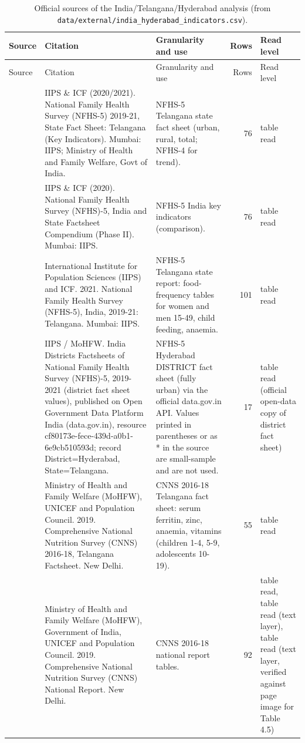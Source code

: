 {\scriptsize\begin{longtable}{L{0.140}L{0.343}L{0.330}rL{0.102}}
\caption[Official sources of the India/Telangana/Hyderabad analysis]{Official sources of the India/Telangana/Hyderabad analysis (from \texttt{data/external/india\_hyderabad\_indicators.csv}).}\label{tab:indiasources}\\
\toprule
Source & Citation & Granularity and use & Rows & Read level \\
\midrule\endfirsthead
\toprule
Source & Citation & Granularity and use & Rows & Read level \\
\midrule\endhead
\bottomrule\endfoot
{} & IIPS \& ICF (2020/2021). National Family Health Survey (NFHS-5) 2019-21, State Fact Sheet: Telangana (Key Indicators). Mumbai: IIPS; Ministry of Health and Family Welfare, Govt of India. & NFHS-5 Telangana state fact sheet (urban, rural, total; NFHS-4 for trend). & 76 & table read \\
 & IIPS \& ICF (2020). National Family Health Survey (NFHS)-5, India and State Factsheet Compendium (Phase II). Mumbai: IIPS. & NFHS-5 India key indicators (comparison). & 76 & table read \\
 & International Institute for Population Sciences (IIPS) and ICF. 2021. National Family Health Survey (NFHS-5), India, 2019-21: Telangana. Mumbai: IIPS. & NFHS-5 Telangana state report: food-frequency tables for women and men 15-49, child feeding, anaemia. & 101 & table read \\
 & IIPS / MoHFW. India Districts Factsheets of National Family Health Survey (NFHS)-5, 2019-2021 (district fact sheet values), published on Open Government Data Platform India (data.gov.in), resource cf80173e-fece-439d-a0b1-6e9cb510593d; record District=Hyderabad, State=Telangana. & NFHS-5 Hyderabad DISTRICT fact sheet (fully urban) via the official data.gov.in API. Values printed in parentheses or as * in the source are small-sample and are not used. & 17 & table read (official open-data copy of district fact sheet) \\
 & Ministry of Health and Family Welfare (MoHFW), UNICEF and Population Council. 2019. Comprehensive National Nutrition Survey (CNNS) 2016-18, Telangana Factsheet. New Delhi. & CNNS 2016-18 Telangana fact sheet: serum ferritin, zinc, anaemia, vitamins (children 1-4, 5-9, adolescents 10-19). & 55 & table read \\
 & Ministry of Health and Family Welfare (MoHFW), Government of India, UNICEF and Population Council. 2019. Comprehensive National Nutrition Survey (CNNS) National Report. New Delhi. & CNNS 2016-18 national report tables. & 92 & table read, table read (text layer), table read (text layer, verified against page image for Table 4.5) \\

\end{longtable}}
